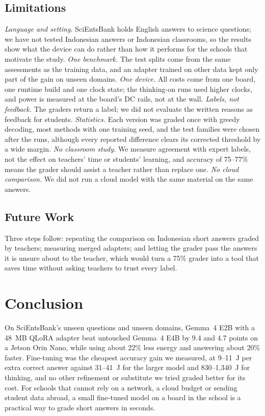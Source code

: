 \documentclass[journal]{IEEEtran}
\begin{document}
\subsection{Limitations}
\textit{Language and setting.} SciEntsBank holds English answers to science questions; we have not tested Indonesian answers or Indonesian classrooms, so the results show what the device can do rather than how it performs for the schools that motivate the study.
\textit{One benchmark.} The test splits come from the same assessments as the training data, and an adapter trained on other data kept only part of the gain on unseen domains.
\textit{One device.} All costs come from one board, one runtime build and one clock state; the thinking-on runs used higher clocks, and power is measured at the board's DC rails, not at the wall.
\textit{Labels, not feedback.} The graders return a label; we did not evaluate the written reasons as feedback for students.
\textit{Statistics.} Each version was graded once with greedy decoding, most methods with one training seed, and the test families were chosen after the runs, although every reported difference clears its corrected threshold by a wide margin.
\textit{No classroom study.} We measure agreement with expert labels, not the effect on teachers' time or students' learning, and accuracy of 75--77\% means the grader should assist a teacher rather than replace one.
\textit{No cloud comparison.} We did not run a cloud model with the same material on the same answers.

\subsection{Future Work}
Three steps follow: repeating the comparison on Indonesian short answers graded by teachers; measuring merged adapters; and letting the grader pass the answers it is unsure about to the teacher, which would turn a 75\% grader into a tool that saves time without asking teachers to trust every label.

\section{Conclusion}
\label{sec:conclusion}
On SciEntsBank's unseen questions and unseen domains, Gemma~4 E2B with a 48~MB QLoRA adapter beat untouched Gemma~4 E4B by 9.4 and 4.7 points on a Jetson Orin Nano, while using about 22\% less energy and answering about 20\% faster.
Fine-tuning was the cheapest accuracy gain we measured, at 9--11~J per extra correct answer against 31--41~J for the larger model and 830--1{,}340~J for thinking, and no other refinement or substitute we tried graded better for its cost.
For schools that cannot rely on a network, a cloud budget or sending student data abroad, a small fine-tuned model on a board in the school is a practical way to grade short answers in seconds.




% 
\end{document}
